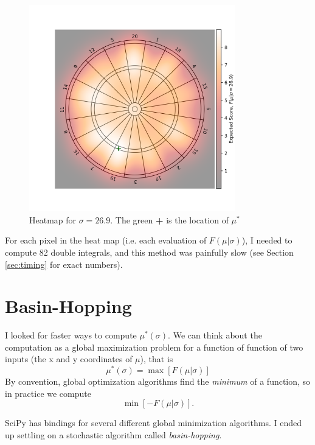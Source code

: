 \documentclass[]{article}
\newcommand{\mustar}{\ensuremath{\mu^* }}
\begin{document}
\begin{figure}[h]
	\centering
	\includegraphics[width=0.8\textwidth]{../images/gist_hear.png}
	\caption{Heatmap for $\sigma = 26.9$. The green \textbf{+} is the location of  \mustar}
	\label{fig:basicheatmap}
\end{figure}

For each pixel in the heat map (i.e. each evaluation of $F(\mu \vert \sigma)$), I needed to compute 82 double integrals, and this method was painfully slow (see Section \ref{sec:timing} for exact numbers).


\section{Basin-Hopping}

I looked for faster ways to compute  $\mu^*(\sigma)$. We can think about the computation as a global maximization problem for a function of function of two inputs (the x and y coordinates of $\mu$), that is
\begin{equation}
	\mu^*(\sigma) = \max [F(\mu \vert \sigma)]
\end{equation}
By convention, global optimization algorithms find the \textit{minimum} of a function, so in practice we compute 
\begin{equation}
	\min[-F(\mu \vert \sigma)].
\end{equation}

SciPy has bindings for several different global minimization algorithms. I ended up settling on a stochastic algorithm called \textit{basin-hopping}. 
\end{document}
